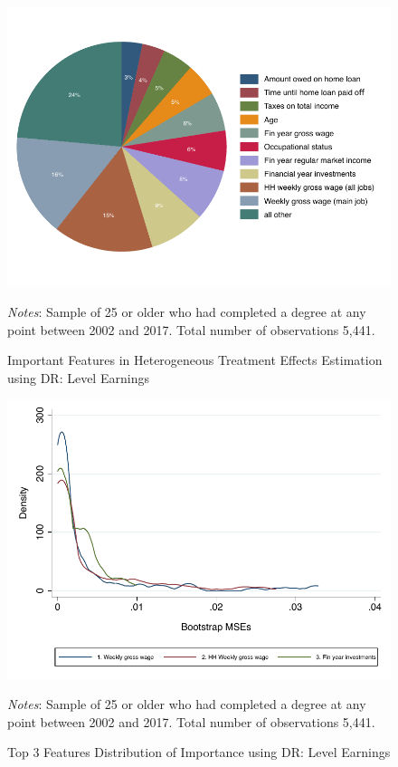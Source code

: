 \documentclass[12pt, a4paper]{article}
\begin{document}
\begin{figure}[htbp]
\centering
\caption{Important Features in Heterogeneous Treatment Effects Estimation using DR: Level Earnings}
\vspace{0.5cm}
  \label{fig:featgbrDR}
    \includegraphics{_figures/DR_influenceP_GBR_le_100.pdf}
\parbox{1\textwidth}{\footnotesize{\textit{Notes}: Sample of 25 or older who had completed a degree at any point between 2002 and 2017. Total number of observations 5,441.}}
\end{figure}

\begin{figure}[htbp]
\centering
\caption{Top 3 Features Distribution of Importance using DR: Level Earnings}
\vspace{0.5cm}
  \label{fig:dengbrlevDR} 
    \includegraphics{_figures/density_GBR_le_100_top3_DR.pdf}
\parbox{1\textwidth}{\footnotesize{\textit{Notes}: Sample of 25 or older who had completed a degree at any point between 2002 and 2017. Total number of observations 5,441.}}
\end{figure}
\end{document}
